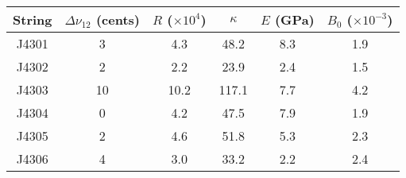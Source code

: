 \begin{tabular}{cccccc}
\toprule
String &  $\Delta \nu_{12}$ (cents) &  $R$ ($\times 10^4$) &  $\kappa$ &  $E$ (GPa) &  $B_0$ ($\times 10^{-3}$) \\
\midrule
 J4301 &                          3 &                  4.3 &      48.2 &        8.3 &                       1.9 \\
 J4302 &                          2 &                  2.2 &      23.9 &        2.4 &                       1.5 \\
 J4303 &                         10 &                 10.2 &     117.1 &        7.7 &                       4.2 \\
 J4304 &                          0 &                  4.2 &      47.5 &        7.9 &                       1.9 \\
 J4305 &                          2 &                  4.6 &      51.8 &        5.3 &                       2.3 \\
 J4306 &                          4 &                  3.0 &      33.2 &        2.2 &                       2.4 \\
\bottomrule
\end{tabular}

